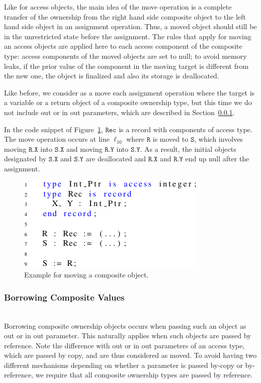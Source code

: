\documentclass{llncs}
\newcommand\var[1]{\ensuremath{\mathtt{#1}}}
\newcommand{\keyword}[1]{\textsf{#1}}
\begin{document}
Like for access objects, the main idea of the move operation is a complete transfer of the ownership from the right hand side composite object to the left hand
side object in an assignment operation. Thus, a moved object should still be in the unrestricted state before the assignment. The rules that apply for moving an
access objects are applied here to each access component of the composite type: access components of the moved objects are set to null; to avoid memory leaks, if the
prior value of the component in the moving target is different from the new one, the object is finalized and also its storage is deallocated.  

\smallskip
Like before, we consider as a move each assignment operation where the target is a variable or a return object of a composite ownership type, but this time we do not
include \keyword{out} or \keyword{in out} parameters, which are described in Section~\ref{subsubsec:borrowComposite}.

\smallskip
In the code snippet of Figure~\ref{fig:movingComposite}, \var{Rec} is a record with components of access type. The move operation occurs at line $\ell_{10}$ where \var{R} is moved
to \var{S}, which involves moving \var{R.X} into \var{S.X} and moving \var{R.Y} into \var{S.Y}. As a result, the initial objects designated by
\var{S.X} and \var{S.Y} are deallocated and \var{R.X} and \var{R.Y} end up null after the assignment. 


\begin{figure}[htb!]
\centering
   \includegraphics[]{movingComposite}
   \caption{Example for moving a composite object.}
   \label{fig:movingComposite}
\end{figure}
 
\subsubsection{Borrowing Composite Values}
\label{subsubsec:borrowComposite}
\ \\

Borrowing composite ownership objects occurs when passing such an object as \keyword{out} or \keyword{in out} parameter. This naturally applies when
such objects are passed by reference. Note the difference with \keyword{out} or \keyword{in out} parameters of an access type, which are passed by copy,
and are thus considered as moved. To avoid having two different mechanisms depending on whether a parameter is passed by-copy or by-reference, we require
that all composite ownership types are passed by reference.
\end{document}
